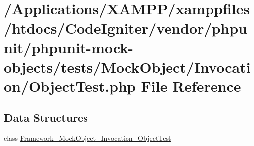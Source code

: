 \hypertarget{_object_test_8php}{}\section{/\+Applications/\+X\+A\+M\+P\+P/xamppfiles/htdocs/\+Code\+Igniter/vendor/phpunit/phpunit-\/mock-\/objects/tests/\+Mock\+Object/\+Invocation/\+Object\+Test.php File Reference}
\label{_object_test_8php}
\subsection*{Data Structures}
\begin{DoxyCompactItemize}
\item 
class \mbox{\hyperlink{class_framework___mock_object___invocation___object_test}{Framework\+\_\+\+Mock\+Object\+\_\+\+Invocation\+\_\+\+Object\+Test}}
\end{DoxyCompactItemize}
